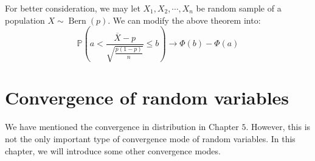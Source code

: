 \documentclass{huhtakm-template-book}
\newcommand{\prob}{\mathbb{P}}
\DeclareMathOperator{\Bern}{Bern}
\begin{document}
\begin{rem}
	For better consideration, we may let $X_{1},X_{2},\cdots,X_{n}$ be random sample of a population $X\sim\Bern(p)$. We can modify the above theorem into:
	\begin{equation*}
		\prob\left(a<\frac{\overline{X}-p}{\sqrt{\frac{p(1-p)}{n}}}\leq b\right)\to\Phi(b)-\Phi(a)
	\end{equation*}
\end{rem}

\chapter{Convergence of random variables}
We have mentioned the convergence in distribution in Chapter $5$. However, this is not the only important type of convergence mode of random variables. In this chapter, we will introduce some other convergence modes.
\end{document}
